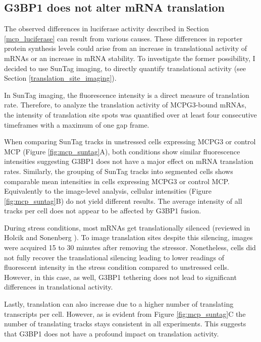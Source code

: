 \subsection{G3BP1 does not alter mRNA translation}\label{mcp_suntag}

The observed differences in luciferase activity described in Section \ref{mcp_luciferase} can result from various causes.
These differences in reporter protein synthesis levels could arise from an increase in translational activity of mRNAs or an increase in mRNA stability.
To investigate the former possibility, I decided to use SunTag imaging, to directly quantify translational activity (see Section \ref{translation_site_imaging}).

In SunTag imaging, the fluorescence intensity is a direct measure of translation rate.
Therefore, to analyze the translation activity of MCPG3-bound mRNAs, the intensity of translation site spots was quantified over at least four consecutive timeframes with a maximum of one gap frame.

When comparing SunTag tracks in unstressed cells expressing MCPG3 or control MCP (Figure \ref{fig:mcp_suntag}A), both conditions show similar fluorescence intensities suggesting G3BP1 does not have a major effect on mRNA translation rates.
Similarly, the grouping of SunTag tracks into segmented cells shows comparable mean intensities in cells expressing MCPG3 or control MCP.
Equivalently to the image-level analysis, cellular intensities (Figure \ref{fig:mcp_suntag}B) do not yield different results.
The average intensity of all tracks per cell does not appear to be affected by G3BP1 fusion.

During stress conditions, most mRNAs get translationally silenced (reviewed in Holcik and Sonenberg \cite{holcik_translational_2005}).
To image translation sites despite this silencing, images were acquired 15 to 30 minutes after removing the stressor.
Nonetheless, cells did not fully recover the translational silencing leading to lower readings of fluorescent intensity in the stress condition compared to unstressed cells.
However, in this case, as well, G3BP1 tethering does not lead to significant differences in translational activity.

Lastly, translation can also increase due to a higher number of translating transcripts per cell.
However, as is evident from Figure \ref{fig:mcp_suntag}C the number of translating tracks stays consistent in all experiments.
This suggests that G3BP1 does not have a profound impact on translation activity.


